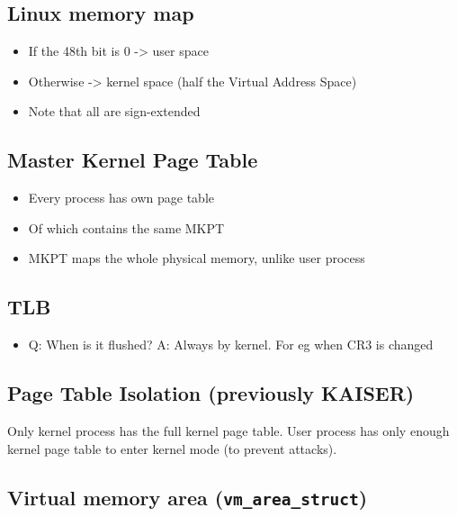 \documentclass[11pt]{article}
\begin{document}
\subsection{Linux memory map}
\label{sec:orgc6e86fe}
\begin{itemize}
\item If the 48th bit is 0 -> user space
\item Otherwise -> kernel space (half the Virtual Address Space)
\item Note that all are sign-extended
\end{itemize}
\subsection{Master Kernel Page Table}
\label{sec:orgc7d6a6c}
\begin{itemize}
\item Every process has own page table
\item Of which contains the same MKPT
\item MKPT maps the whole physical memory, unlike user process
\end{itemize}
\subsection{TLB}
\label{sec:org14412de}
\begin{itemize}
\item Q: When is it flushed?
A: Always by kernel. For eg when CR3 is changed
\end{itemize}
\subsection{Page Table Isolation (previously KAISER)}
\label{sec:orgdfa3377}
Only kernel process has the full kernel page table.
User process has only enough kernel page table to enter kernel mode (to prevent attacks).
\subsection{Virtual memory area (\texttt{vm\_area\_struct})}
\label{sec:org679efed}
\end{document}
